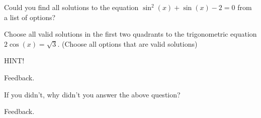 \documentclass{ximera}
\begin{document}
\begin{question}

    Could you find all solutions to the equation $\sin^2(x) + \sin(x) -2 = 0$ from a list of options?
    
    \begin{multipleChoice}
    
    \end{multipleChoice}

\end{question}


\begin{problem} 

\begin{problem}
    Choose all valid solutions in the first two quadrants to the trigonometric equation $2\cos(x) = \sqrt{3}$.  (Choose all options that are valid solutions)
    
    \begin{hint}
    HINT!
    \end{hint}

  \begin{selectAll}
      \choice{$\pi$}
      
      \begin{feedback}[attempt]
      Feedback.
      \end{feedback}
      
  \end{selectAll}
  
\end{problem}

\begin{question}
  
  If you didn't, why didn't you answer the above question?
  
  \begin{multipleChoice}
      
      \begin{feedback}[attempt]
      Feedback.
      \end{feedback}
  \end{multipleChoice}
  
\end{question}
  
\end{problem}
\end{document}
